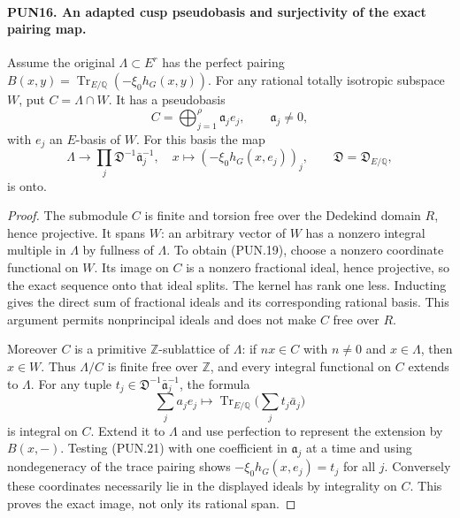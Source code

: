 \paragraph{PUN16. An adapted cusp pseudobasis and surjectivity of the exact pairing map.}
\label{claim:PUN16}
Assume the original \(\Lambda\subset E^r\) has the perfect
pairing \(B(x,y)=\operatorname{Tr}_{E/\mathbb Q}(-\xi_0h_G(x,y))\).
For any rational totally isotropic subspace \(W\), put
\(C=\Lambda\cap W\).  It has a pseudobasis
\[
                    C=\bigoplus_{j=1}^{\rho}\mathfrak a_j e_j,
                    \qquad \mathfrak a_j\ne0,
 \tag{PUN.19}
\]
with \(e_j\) an \(E\)-basis of \(W\).  For this basis the
map
\[
 \Lambda\longrightarrow\prod_j
        \mathfrak D^{-1}\bar{\mathfrak a}_j^{-1},
 \quad x\longmapsto(-\xi_0h_G(x,e_j))_j,
 \qquad\mathfrak D=\mathfrak D_{E/\mathbb Q},
 \tag{PUN.20}
\]
is onto.

\begin{proof}
The submodule \(C\) is finite and torsion free over the Dedekind
domain \(R\), hence projective.  It spans \(W\): an arbitrary
vector of \(W\) has a nonzero integral multiple in \(\Lambda\)
by fullness of \(\Lambda\).  To obtain (PUN.19), choose a
nonzero coordinate functional on \(W\).  Its image on \(C\)
is a nonzero fractional ideal, hence projective, so the exact
sequence onto that ideal splits.  The kernel has rank one less.
Inducting gives the direct sum of fractional ideals and its
corresponding rational basis.  This argument permits nonprincipal
ideals and does not make \(C\) free over \(R\).

Moreover \(C\) is a primitive \(\mathbb Z\)-sublattice of
\(\Lambda\): if \(n x\in C\) with \(n\ne0\) and
\(x\in\Lambda\), then \(x\in W\).  Thus
\(\Lambda/C\) is finite free over \(\mathbb Z\), and every
integral functional on \(C\) extends to \(\Lambda\).
For any tuple \(t_j\in\mathfrak D^{-1}\bar{\mathfrak a}_j^{-1}\),
the formula
\[
          \sum_j a_j e_j\longmapsto
                  \operatorname{Tr}_{E/\mathbb Q}
                                      \bigl(\sum_j t_j\bar a_j\bigr)
 \tag{PUN.21}
\]
is integral on \(C\).  Extend it to \(\Lambda\) and use
perfection to represent the extension by \(B(x,-)\).
Testing (PUN.21) with one coefficient in \(\mathfrak a_j\)
at a time and using nondegeneracy of the trace pairing shows
\(-\xi_0h_G(x,e_j)=t_j\) for all \(j\).
Conversely these coordinates necessarily lie in the displayed
ideals by integrality on \(C\).  This proves the exact image,
not only its rational span.
\end{proof}

